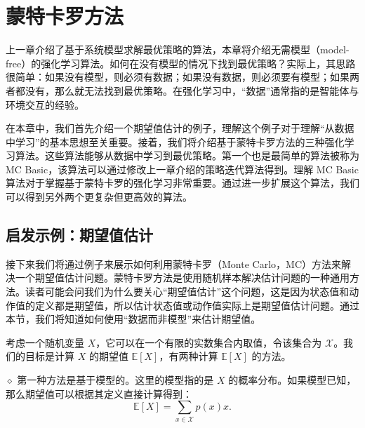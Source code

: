 \chapter{蒙特卡罗方法}
\label{ch:rl-mc}



上一章介绍了基于系统模型求解最优策略的算法，本章将介绍无需模型（model-free）的强化学习算法。如何在没有模型的情况下找到最优策略？实际上，其思路很简单：如果没有模型，则必须有数据；如果没有数据，则必须要有模型；如果两者都没有，那么就无法找到最优策略。在强化学习中，“数据”通常指的是智能体与环境交互的经验。

在本章中，我们首先介绍一个期望值估计的例子，理解这个例子对于理解“从数据中学习”的基本思想至关重要。接着，我们将介绍基于蒙特卡罗方法的三种强化学习算法。这些算法能够从数据中学习到最优策略。第一个也是最简单的算法被称为 MC Basic，该算法可以通过修改上一章介绍的策略迭代算法得到。理解 MC Basic 算法对于掌握基于蒙特卡罗的强化学习非常重要。通过进一步扩展这个算法，我们可以得到另外两个更复杂但更高效的算法。

\section{启发示例：期望值估计}
\label{sec:rl-mc-mean-estimation}

接下来我们将通过例子来展示如何利用蒙特卡罗（Monte Carlo，MC）方法来解决一个期望值估计问题。蒙特卡罗方法是使用随机样本解决估计问题的一种通用方法。读者可能会问我们为什么要关心“期望值估计”这个问题，这是因为状态值和动作值的定义都是期望值，所以估计状态值或动作值实际上是期望值估计问题。通过本节，我们将知道如何使用“数据而非模型”来估计期望值。

考虑一个随机变量 $X$，它可以在一个有限的实数集合内取值，令该集合为 $\mathcal{X}$。我们的目标是计算 $X$ 的期望值 $\mathbb{E}[X]$，有两种计算 $\mathbb{E}[X]$ 的方法。

$\diamond$ 第一种方法是基于模型的。这里的模型指的是 $X$ 的概率分布。如果模型已知，那么期望值可以根据其定义直接计算得到：
\begin{equation}
\mathbb{E}[X] = \sum_{x \in \mathcal{X}} p(x) x.
\end{equation}

